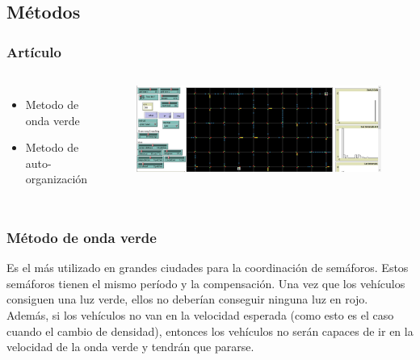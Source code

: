 \documentclass{beamer}
\begin{document}
\subsection{Métodos}
%
\begin{frame}
	\frametitle{Artículo}
	
	\begin{columns}[c] %
		\begin{itemize}
			\item Metodo de onda verde
			\item Metodo de auto-organización
		\end{itemize}
		\begin{figure}
			\label{[fig01]}
			\includegraphics[scale=0.2]{net.JPG}
		\end{figure}
		
	\end{columns}
	
	
	
\end{frame}
%
%

\begin{frame}
	\frametitle{Método de onda verde}
	Es el más utilizado en grandes ciudades para la coordinación de semáforos. Estos semáforos tienen el mismo período y la compensación. Una vez que los vehículos consiguen una luz verde, ellos no deberían conseguir ninguna luz en rojo.\\
	Además, si los vehículos no van en la velocidad esperada (como esto es el caso cuando el cambio de densidad), entonces los vehículos no serán capaces de ir en la velocidad de la onda verde y tendrán que pararse.
	
	
\end{frame}
%
%
\end{document}
